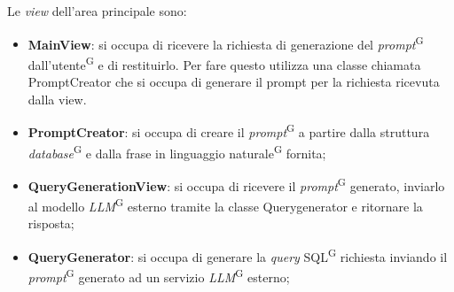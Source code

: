 \documentclass[5pt]{article}
\begin{document}
	Le \textit{view} dell'area principale sono:
	\begin{itemize}
		\item  \textbf{MainView}: si occupa di ricevere la richiesta di generazione del \textit{prompt}\textsuperscript{G} dall'utente\textsuperscript{G} e di restituirlo. Per fare questo utilizza una classe chiamata PromptCreator che si occupa di generare il prompt per la richiesta ricevuta dalla view.
		\item \textbf{PromptCreator}: si occupa di creare il \textit{prompt}\textsuperscript{G} a partire dalla struttura \textit{database}\textsuperscript{G} e dalla frase in linguaggio naturale\textsuperscript{G} fornita;
		\item \textbf{QueryGenerationView}: si occupa di ricevere il \textit{prompt}\textsuperscript{G} generato, inviarlo al modello \textit{LLM}\textsuperscript{G} esterno tramite la classe Querygenerator e ritornare la risposta;
		\item \textbf{QueryGenerator}: si occupa di generare la \textit{query} SQL\textsuperscript{G} richiesta inviando il \textit{prompt}\textsuperscript{G} generato ad un servizio \textit{LLM}\textsuperscript{G} esterno;
	\end{itemize}
\end{document}
